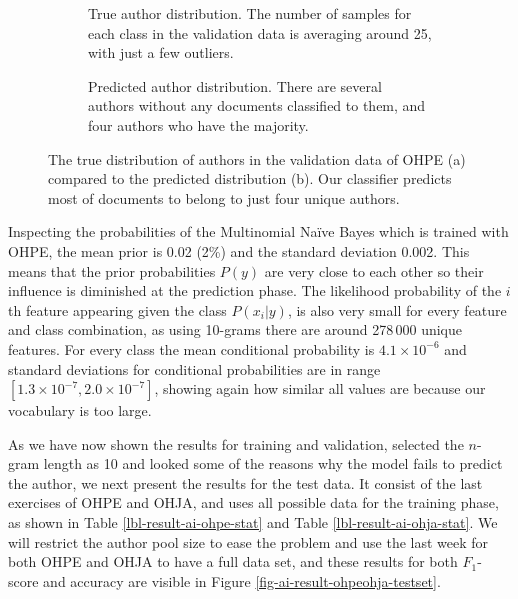 \begin{figure}[ht] 
  \centering
  \begin{subfigure}[b]{\linewidth}
    \centering
    \setlength\figureheight{5.5cm}
    \setlength\figurewidth{\textwidth}
    
    \caption{True author distribution. The number of samples for each class in the validation data is averaging around 25, with just a few outliers.}
    \vspace{4ex}
  \end{subfigure}
  \begin{subfigure}[b]{\linewidth}
    \centering
    \setlength\figureheight{5.5cm}
    \setlength\figurewidth{\textwidth}
    
    \caption{Predicted author distribution. There are several authors without any documents classified to them, and four authors who have the majority.}
  \end{subfigure}
  \caption{The true distribution of authors in the validation data of OHPE (a) compared to the predicted distribution (b). Our classifier predicts most of documents to belong to just four unique authors.}
  \label{fig-ai-result-author-distr}
\end{figure}



Inspecting the probabilities of the Multinomial Naïve Bayes which is trained with OHPE, the mean prior is 0.02 (2\%) and the standard deviation 0.002. This means that the prior probabilities $P(y)$ are very close to each other so their influence is diminished at the prediction phase. The likelihood \ie probability of the $i$th feature appearing given the class $P(x_i | y)$, is also very small for every feature and class combination, as using 10-grams there are around 278\,000 unique features. For every class the mean conditional probability is $4.1 \times 10^{-6}$ and standard deviations for conditional probabilities are in range $[1.3 \times 10^{-7}, 2.0 \times 10^{-7}]$, showing again how similar all values are because our vocabulary is too large. 

As we have now shown the results for training and validation, selected the $n$-gram length as 10 and looked some of the reasons why the model fails to predict the author, we next present the results for the test data. It consist of the last exercises of OHPE and OHJA, and uses all possible data for the training phase, as shown in Table \ref{lbl-result-ai-ohpe-stat} and Table \ref{lbl-result-ai-ohja-stat}. We will restrict the author pool size to ease the problem and use the last week for both OHPE and OHJA to have a full data set, and these results for both $F_1$-score and accuracy are visible in Figure \ref{fig-ai-result-ohpeohja-testset}. 



